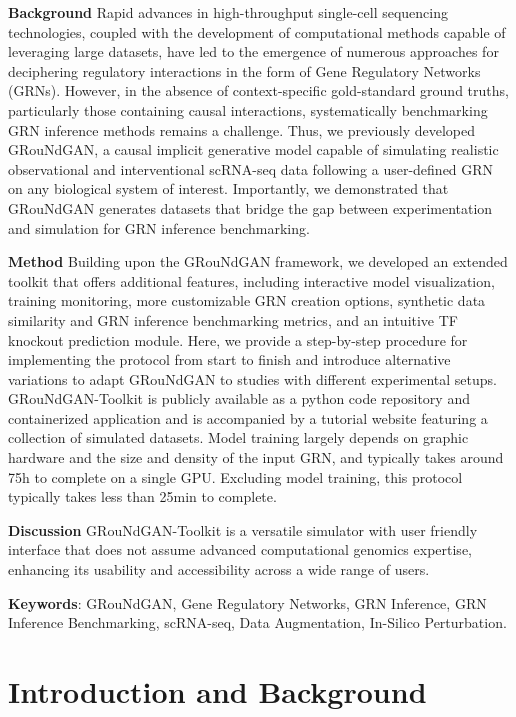 \textbf{Background} Rapid advances in high-throughput single-cell sequencing technologies, coupled with the development of computational methods capable of leveraging large datasets, have led to the emergence of numerous approaches for deciphering regulatory interactions in the form of Gene Regulatory Networks (GRNs). However, in the absence of context-specific gold-standard ground truths, particularly those containing causal interactions, systematically benchmarking GRN inference methods remains a challenge. Thus, we previously developed GRouNdGAN, a causal implicit generative model capable of simulating realistic observational and interventional scRNA-seq data following a user-defined GRN on any biological system of interest. Importantly, we demonstrated that GRouNdGAN generates datasets that bridge the gap between experimentation and simulation for GRN inference benchmarking.

\textbf{Method} Building upon the GRouNdGAN framework, we developed an extended toolkit that offers additional features, including interactive model visualization, training monitoring, more customizable GRN creation options, synthetic data similarity and GRN inference benchmarking metrics, and an intuitive TF knockout prediction module. Here, we provide a step-by-step
procedure for implementing the protocol from start to finish and introduce alternative variations to adapt GRouNdGAN to studies with different experimental setups. GRouNdGAN-Toolkit is publicly available as a python code repository and containerized application and is accompanied by a tutorial website featuring a collection of simulated datasets. Model training largely depends on graphic hardware and the size and density of the input GRN, and typically takes around 75h to complete on a single GPU. Excluding model training, this protocol typically takes less than
25min to complete.

\textbf{Discussion} GRouNdGAN-Toolkit is a versatile simulator with user friendly interface that does not assume advanced computational genomics expertise, enhancing its usability and accessibility across a wide range of users.

\textbf{Keywords}: GRouNdGAN, Gene Regulatory Networks, GRN Inference, GRN Inference Benchmarking, scRNA-seq, Data Augmentation, In-Silico Perturbation.

\section*{Introduction and Background}

